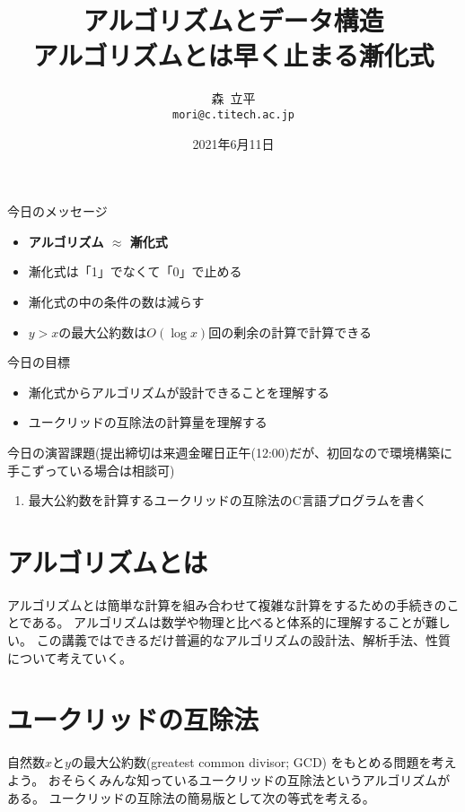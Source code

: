 \documentclass[a4paper,oneside,onecolumn,openany,article,10pt]{memoir}
\title{アルゴリズムとデータ構造\\\vspace{.5em} \Large アルゴリズムとは早く止まる漸化式}
\date{2021年6月11日}
\author{森~立平\\ \texttt{mori@c.titech.ac.jp}}
\theoremstyle{remark}
\begin{document}
\maketitle


\noindent
今日のメッセージ
\begin{itemize}
\item \textbf{アルゴリズム $\approx$ 漸化式}
\item 漸化式は「1」でなくて「0」で止める
\item 漸化式の中の条件の数は減らす
\item $y>x$の最大公約数は$O(\log x)$回の剰余の計算で計算できる
\end{itemize}

\noindent
今日の目標
\begin{itemize}
\item 漸化式からアルゴリズムが設計できることを理解する
\item ユークリッドの互除法の計算量を理解する
\end{itemize}

\noindent
今日の演習課題(提出締切は来週金曜日正午(12:00)だが、初回なので環境構築に手こずっている場合は相談可)
\begin{enumerate}
\item 最大公約数を計算するユークリッドの互除法のC言語プログラムを書く
\end{enumerate}


\section{アルゴリズムとは}
アルゴリズムとは簡単な計算を組み合わせて複雑な計算をするための手続きのことである。
アルゴリズムは数学や物理と比べると体系的に理解することが難しい。
この講義ではできるだけ普遍的なアルゴリズムの設計法、解析手法、性質について考えていく。

\section{ユークリッドの互除法}
自然数$x$と$y$の最大公約数(greatest common divisor; GCD) をもとめる問題を考えよう。
おそらくみんな知っているユークリッドの互除法というアルゴリズムがある。
ユークリッドの互除法の簡易版として次の等式を考える。
\end{document}
